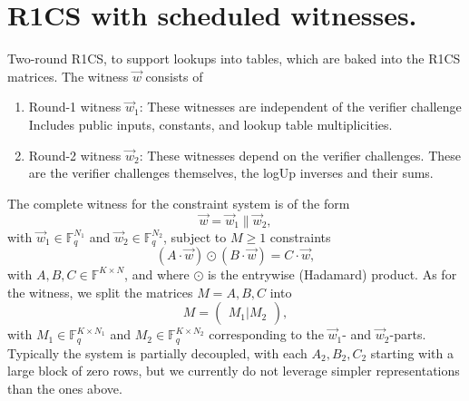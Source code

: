 
\section{R1CS with scheduled witnesses. \tbc}
Two-round R1CS, to support lookups into tables, which are baked into the R1CS matrices.
The witness $\vec w$ consists of 
\begin{enumerate}
    \item 
    Round-1 witness $\vec w_1$: 
    These witnesses are independent of the verifier challenge
    Includes public inputs, constants, and lookup table multiplicities.
    \item 
    Round-2 witness $\vec w_2$: 
    These witnesses depend on the verifier challenges.
    These are the verifier challenges themselves, the logUp inverses and their sums.
\end{enumerate}
The complete witness for the constraint system is of the form 
\begin{equation*}
\vec w = \vec w_1\| \vec w_2,
\end{equation*}
with $\vec w_1\in \mathbb F_q^{N_1}$ and $\vec w_2\in \mathbb F_q^{N_2}$, 
subject to $M\geq 1$ constraints
\begin{equation*}
(A\cdot \vec w) \odot (B\cdot \vec w) = C\cdot \vec w,
\end{equation*}
with $A, B, C\in \mathbb F^{K\times N}$, and where $\odot$ is the entrywise (Hadamard) product.
As for the witness, we split the matrices $M= A, B, C$ into 
\begin{equation*}
M = 
\begin{pmatrix}
M_1 | M_2
\end{pmatrix}, 
\end{equation*}
with $M_1\in \mathbb F_q^{K \times N_1}$ and $M_2\in \mathbb F_q^{K\times N_2}$ corresponding to the $\vec w_1$- and $\vec w_2$-parts. 
Typically the system is partially decoupled, with each $A_2, B_2, C_2$ starting with a large block of zero rows, but we currently do not leverage simpler representations than the ones above. 

